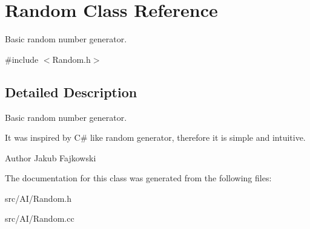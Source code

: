 \hypertarget{classRandom}{}\section{Random Class Reference}
\label{classRandom}


Basic random number generator.  




{\ttfamily \#include $<$Random.\+h$>$}



\subsection{Detailed Description}
Basic random number generator. 

It was inspired by C\# like random generator, therefore it is simple and intuitive. \begin{DoxyAuthor}{Author}
Jakub Fajkowski 
\end{DoxyAuthor}


The documentation for this class was generated from the following files\+:\begin{DoxyCompactItemize}
\item 
src/\+A\+I/Random.\+h\item 
src/\+A\+I/Random.\+cc\end{DoxyCompactItemize}

